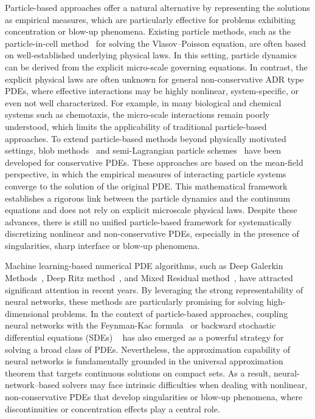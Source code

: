 \documentclass[a4paper,fleqn]{cas-sc}
\theoremstyle{definition}
\theoremstyle{remark}
\begin{document}
Particle-based approaches offer a natural alternative by representing the solutions as empirical measures, which are particularly effective for problems exhibiting concentration or blow-up phenomena. 
Existing particle methods, such as the particle-in-cell method~\cite{birdsall2018plasma, hockney2021computer} for solving the Vlasov--Poisson equation, are often based on well-established  underlying physical laws. In this setting, particle dynamics can be derived from the explicit micro-scale governing equations. In contrast, the explicit physical laws are often unknown for general non-conservative ADR type PDEs, where effective interactions may be highly nonlinear, system-specific, or even not well characterized. For example, in many biological and chemical systems such as chemotaxis, the micro-scale interactions remain poorly understood, which limits the applicability of traditional particle-based approaches.
To extend particle-based methods beyond physically motivated settings, blob methods~\cite{craig2016blob,carrillo2019blob,huang2017error} and semi-Lagrangian particle schemes~\cite{qiu2010conservative,qiu2011conservative,qiu2011positivity} have been developed for conservative PDEs.
These approaches are based on the mean-field perspective, in which the empirical measures of interacting particle systems converge to the solution of the original PDE. This mathematical framework establishes a rigorous link between the particle dynamics and the continuum equations and does not rely on explicit microscale physical laws. Despite these advances, there is still no unified particle-based framework for systematically discretizing nonlinear and non-conservative PDEs, especially in the presence of singularities, sharp interface or blow-up phenomena.

Machine learning-based numerical PDE algorithms, such as Deep Galerkin Methods~\cite{sirignano2018dgm}, Deep Ritz method~\cite{yu2018deep}, and Mixed Residual method~\cite{lyu2022mim}, have attracted significant attention in recent years. By leveraging the strong representability of neural networks, these methods are particularly promising for solving high-dimensional problems. In the context of particle-based approaches, coupling neural networks with the Feynman-Kac formula~\cite{han2024deep, hutzenthaler2021speed, nguwi2024deep,beck2021deep} or backward stochastic differential equations (SDEs) ~\cite{han2017deep, han2018solving, hure2020deep} has also emerged as a powerful strategy for solving a broad class of PDEs. Nevertheless, the approximation capability of neural networks is fundamentally grounded in the universal approximation theorem that targets continuous solutions on compact sets.
As a result, neural-network–based solvers may face intrinsic difficulties when dealing with nonlinear, non-conservative PDEs that develop singularities or blow-up phenomena, where discontinuities or concentration effects play a central role.
\end{document}
